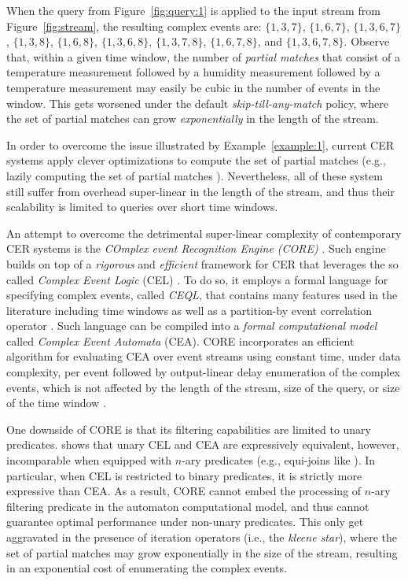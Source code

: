 \begin{example}
When the query from Figure~\ref{fig:query:1} is applied to the input stream from Figure~\ref{fig:stream}, the resulting complex events are: $\{ 1, 3, 7 \}$, $\{ 1, 6, 7 \}$, $\{ 1, 3, 6, 7 \}$, $\{ 1, 3, 8 \}$, $\{ 1, 6, 8 \}$, $\{ 1, 3, 6, 8 \}$, $\{ 1, 3, 7, 8\}$, $\{ 1, 6, 7, 8\}$, and $\{ 1, 3, 6, 7, 8\}$. Observe that, within a given time window, the number of \emph{partial matches} that consist of a temperature measurement followed by a humidity measurement followed by a temperature measurement may easily be cubic in the number of events in the window. This gets worsened under the default \emph{skip-till-any-match} \cite{skip-till-any-match} policy, where the set of partial matches can grow \emph{exponentially} in the length of the stream.
\end{example}

In order to overcome the issue illustrated by Example~\ref{example:1}, current CER systems apply clever optimizations to compute the set of partial matches (e.g., lazily computing the set of partial matches \cite{core}). Nevertheless, all of these system still suffer from overhead super-linear in the length of the stream, and thus their scalability is limited to queries over short time windows.

An attempt to overcome the detrimental super-linear complexity of contemporary CER systems is the \emph{COmplex event Recognition Engine (CORE)} \cite{core}. Such engine builds on top of a \emph{rigorous} and \emph{efficient} framework for CER that leverages the so called \emph{Complex Event Logic} (CEL) \cite{formal-framework-cep, formal-framework-cer}. To do so, it employs a formal language for specifying complex events, called \emph{CEQL}, that contains many features used in the literature including time windows as well as a partition-by event correlation operator \cite{on-the-expressiveness, core}. Such language can be compiled into a \emph{formal computational model} called \emph{Complex Event Automata} (CEA). CORE incorporates an efficient algorithm for evaluating CEA over event streams using constant time, under data complexity, per event followed by output-linear delay enumeration of the complex events, which is not affected by the length of the stream, size of the query, or size of the time window \cite{formal-framework-cer, core}.

One downside of CORE is that its filtering capabilities are limited to unary predicates. \cite{on-the-expressiveness} shows that unary CEL and CEA are expressively equivalent, however, incomparable when equipped with $n$-ary predicates (e.g., equi-joins like ). In particular, when CEL is restricted to binary predicates, it is strictly more expressive than CEA. As a result, CORE cannot embed the processing of $n$-ary filtering predicate in the automaton computational model, and thus cannot guarantee optimal performance under non-unary predicates. This only get aggravated in the presence of iteration operators (i.e., the \emph{kleene star}), where the set of partial matches may grow exponentially in the size of the stream, resulting in an exponential cost of enumerating the complex events.

